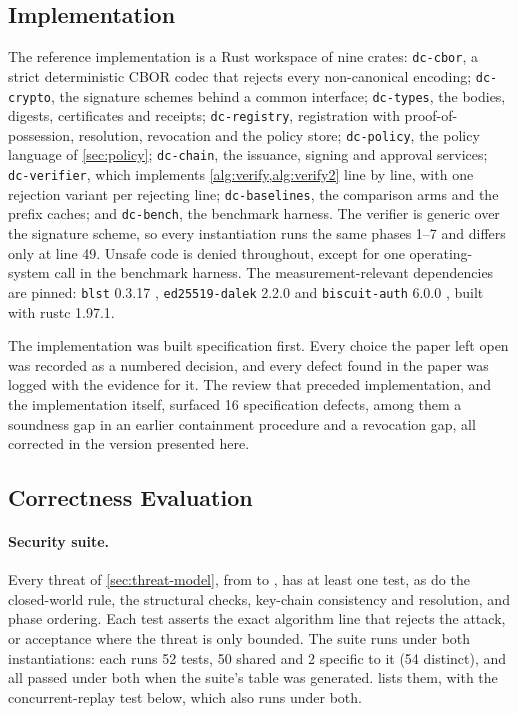 \documentclass[11pt,a4paper]{article}
\begin{document}
\subsection{Implementation}
\label{sec:impl-implementation}

The reference implementation is a Rust workspace of nine crates:
\texttt{dc-cbor}, a strict deterministic CBOR codec that rejects every
non-canonical encoding; \texttt{dc-crypto}, the signature schemes behind
a common interface; \texttt{dc-types}, the bodies, digests, certificates
and receipts; \texttt{dc-registry}, registration with proof-of-possession,
resolution, revocation and the policy store; \texttt{dc-policy}, the
policy language of \cref{sec:policy}; \texttt{dc-chain}, the issuance,
signing and approval services; \texttt{dc-verifier}, which implements
\cref{alg:verify,alg:verify2} line by line, with one rejection variant
per rejecting line; \texttt{dc-baselines}, the comparison arms and the
prefix caches; and \texttt{dc-bench}, the benchmark harness. The verifier
is generic over the signature scheme, so every instantiation runs the
same phases 1--7 and differs only at line 49. Unsafe code is denied
throughout, except for one operating-system call in the benchmark
harness. The measurement-relevant dependencies are pinned:
\texttt{blst} 0.3.17 \citep{blst-0.3.17}, \texttt{ed25519-dalek} 2.2.0
\citep{ed25519-dalek-2.2.0} and \texttt{biscuit-auth} 6.0.0
\citep{biscuit-auth-6.0.0}, built with rustc 1.97.1.

The implementation was built specification first. Every choice the
paper left open was recorded as a numbered decision, and every defect found in the paper was logged with the
evidence for it. The review that preceded implementation, and the
implementation itself, surfaced 16 specification defects, among them a soundness gap in an earlier containment procedure
and a revocation gap, all corrected in the version presented here.

\subsection{Correctness Evaluation}
\label{sec:eval-correctness}

\paragraph{Security suite.}
Every threat of \cref{sec:threat-model}, from  to
, has at least one test, as do the closed-world rule, the
structural checks, key-chain consistency and resolution, and phase
ordering. Each test asserts the exact algorithm line that rejects the
attack, or acceptance where the threat is only bounded. The suite runs
under both instantiations: each runs 52 tests, 50 shared and 2 specific
to it (54 distinct), and all passed under both when the suite's table
was generated.  lists them, with the
concurrent-replay test below, which also runs under both.
\end{document}
